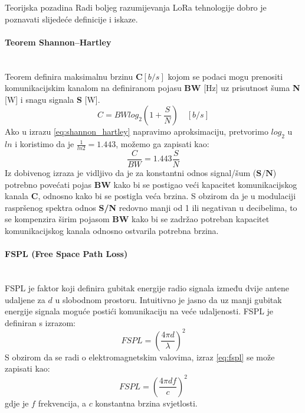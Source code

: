 \newpage
\begin{subsubsection}{Teorijska pozadina}
\label{subsubsection:therory}
Radi boljeg razumijevanja LoRa tehnologije dobro je poznavati slijedeće definicije i iskaze.

\paragraph{Teorem Shannon–Hartley}\mbox{}\\
Teorem definira maksimalnu brzinu $\mathbf{C} [b/s]$ kojom se podaci mogu prenositi komunikacijskim kanalom na definiranom pojasu \textbf{BW} [Hz] uz prisutnost šuma \textbf{N} [W] i snagu signala \textbf{S} [W].
\begin{equation}
C = BW log_{2}(1 + \frac{S}{N}) \quad [b/s]
\label{eq:shannon_hartley}
\end{equation}
Ako u izrazu \ref{eq:shannon_hartley} napravimo aproksimaciju, pretvorimo $log_2$ u $ln$ i koristimo da je $\frac{1}{ln2}= 1.443$, možemo ga zapisati kao:
\begin{equation}
  \frac{C}{BW} = 1.443 \frac{S}{N}
  \label{eq:shannon_hartley_2}
\end{equation}
Iz dobivenog izraza je vidljivo da je za konstantni odnos signal/šum ($\mathbf{S/N}$) potrebno povećati pojas \textbf{BW} kako bi se postigao veći kapacitet komunikacijskog kanala \textbf{C}, odnosno kako bi se postigla  veća brzina.
S obzirom da je u modulaciji raspršenog spektra odnos \textbf{S/N} redovno manji od 1 ili negativan u decibelima, to se kompenzira širim pojasom \textbf{BW} kako bi se zadržao potreban kapacitet komunikacijskog kanala odnosno ostvarila potrebna brzina.

\paragraph{FSPL (Free Space Path Loss)}\mbox{}\\ 
FSPL je faktor koji definira gubitak energije radio signala između dvije antene udaljene za $d$ u slobodnom prostoru. Intuitivno je jasno da uz manji gubitak energije signala moguće postići komunikaciju na veće udaljenosti. FSPL je definiran s izrazom:
\begin{equation}
  FSPL = (\frac{4\pi d}{\lambda})^2 
  \label{eq:fspl}
\end{equation}
S obzirom da se radi o elektromagnetskim valovima, izraz \ref{eq:fspl} se može zapisati kao:
\begin{equation}
  FSPL = (\frac{4\pi d f}{c})^2 
\end{equation}
gdje je $f$ frekvencija, a $c$ konstantna brzina svjetlosti.


\end{subsubsection}

